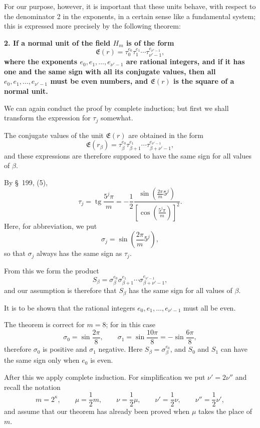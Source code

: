 \documentclass[11pt]{article}
\newcommand{\tg}{\operatorname{tg}}
\begin{document}
For our purpose, however, it is important that these units behave, with respect to the denominator 2 in the exponents,
in a certain sense like a fundamental system; this is expressed more precisely by the following theorem:

\begin{center}\textbf{2. If a normal unit of the field $H_m$ is of the form
\[
\mathfrak E(r)=\tau_0^{e_0}\tau_1^{e_1}\cdots\tau_{\nu'-1}^{e_{\nu'-1}},
\]
where the exponents $e_0,e_1,
\ldots,e_{\nu'-1}$ are rational integers, and if it has one and the same sign with all its conjugate values, then all $e_0,e_1,\ldots,e_{\nu'-1}$ must be even numbers, and $\mathfrak E(r)$ is the square of a normal unit.}\end{center}

We can again conduct the proof by complete induction; but first we shall transform the expression for $\tau_j$ somewhat.

The conjugate values of the unit $\mathfrak E(r)$ are obtained in the form
\[
\mathfrak E(r_\beta)=\tau_\beta^{e_0}\tau_{\beta+1}^{e_1}\cdots\tau_{\beta+\nu'-1}^{e_{\nu'-1}},
\]
and these expressions are therefore supposed to have the same sign for all values of $\beta$.

By \S~199, (5),
\[
\tau_j=\tg\frac{5^j\pi}{m}=-\frac12\frac{\sin\left(\frac{2\pi}{m}5^j\right)}{\left[\cos\left(\frac{5^j\pi}{m}\right)\right]^2}.
\]
Here, for abbreviation, we put
\begin{equation}
\sigma_j=\sin\left(\frac{2\pi}{m}5^j\right),
\tag{14}
\end{equation}
so that $\sigma_j$ always has the same sign as $\tau_j$.

From this we form the product
\begin{equation}
S_\beta=\sigma_\beta^{e_0}\sigma_{\beta+1}^{e_1}\cdots\sigma_{\beta+\nu'-1}^{e_{\nu'-1}},
\tag{15}
\end{equation}
and our assumption is therefore that $S_\beta$ has the same sign for all values of $\beta$.

It is to be shown that the rational integers $e_0,e_1,\ldots,e_{\nu'-1}$ must all be even.

The theorem is correct for $m=8$; for in this case
\[
\sigma_0=\sin\frac{2\pi}{8},\qquad \sigma_1=\sin\frac{10\pi}{8}=-\sin\frac{6\pi}{8},
\]
therefore $\sigma_0$ is positive and $\sigma_1$ negative. Here $S_\beta=\sigma_\beta^{e_0}$, and $S_0$ and $S_1$ can have the same sign only when $e_0$ is even.

After this we apply complete induction. For simplification we put $\nu'=2\nu''$ and recall the notation
\begin{equation}
m=2^\kappa,\qquad \mu=\frac12m,\qquad \nu=\frac12\mu,
\qquad \nu'=\frac12\nu,
\qquad \nu''=\frac12\nu',
\tag{16}
\end{equation}
and assume that our theorem has already been proved when $\mu$ takes the place of $m$.
\end{document}
